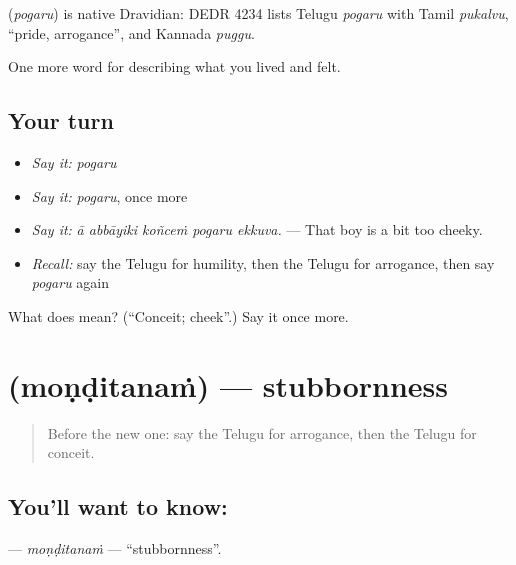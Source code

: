 \begin{cousinweb}
\textbf{} (\emph{pogaru}) is native Dravidian: DEDR 4234 lists Telugu \emph{pogaru} with Tamil \emph{pukalvu}, \textquotedblleft{}pride, arrogance\textquotedblright{}, and Kannada \emph{puggu}.
\end{cousinweb}

\begin{grammarlens}[title={What you've built}]
One more word for describing what you lived and felt.
\end{grammarlens}

\subsection*{Your turn}
\begin{itemize}
\raggedright
  \item \emph{Say it:} \emph{pogaru}
  \item \emph{Say it:} \emph{pogaru}, once more
  \item \emph{Say it:} \emph{ā abbāyiki koñceṁ pogaru ekkuva.} — That boy is a bit too cheeky.
  \item \emph{Recall:} say the Telugu for humility, then the Telugu for arrogance, then say \emph{pogaru} again
\end{itemize}

\begin{tcolorbox}[breakable,colback=teal!4,colframe=teal!35!black,title={Before you move on}]
What does  mean? (\textquotedblleft{}Conceit; cheek\textquotedblright{}.) Say it once more.
\end{tcolorbox}
\section[\texorpdfstring{\te{మొండితనం} (moṇḍitanaṁ)}{మొండితనం (moṇḍitanaṁ)}]{ (moṇḍitanaṁ) — stubbornness}

\label{lesson:TE-C508-monditanam}



\begin{quote}
Before the new one: say the Telugu for arrogance, then the Telugu for conceit.
\end{quote}

\subsection*{You'll want to know: }
\textbf{} — \emph{moṇḍitanaṁ} — \textquotedblleft{}stubbornness\textquotedblright{}.

